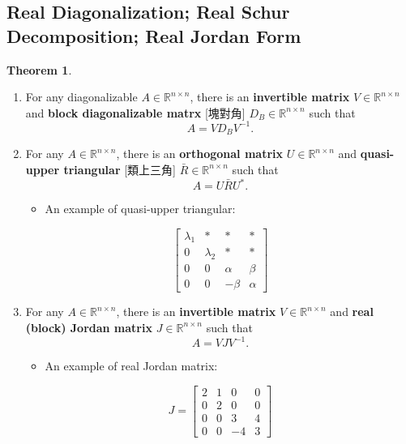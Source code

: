 \documentclass{article}
\theoremstyle{definition}
\newtheorem{theorem}{Theorem}[section]
\numberwithin{theorem}{section}
\numberwithin{equation}{section}
\begin{document}
\subsection{Real Diagonalization; Real Schur Decomposition; Real Jordan Form}

\begin{theorem}
    \begin{enumerate}
\item  For any diagonalizable $A \in \mathbb{R}^{n \times n}$, there is an \textbf{invertible matrix} $V\in \mathbb{R}^{n \times n}$ and \textbf{block diagonalizable matrx} [塊對角] $D_B\in \mathbb{R}^{n \times n}$ such that
  \[
   A= VD_BV^{-1}.
   \]
\item For any $A \in \mathbb{R}^{n \times n}$, there is an \textbf{orthogonal matrix} $U\in \mathbb{R}^{n \times n}$ and \textbf{quasi-upper triangular} [類上三角]
  $\bar{R}\in \mathbb{R}^{n \times n}$ such that
  \[
   A= U\bar{R}U^*.
   \]
  \begin{itemize}
  \item    An example of quasi-upper triangular:
  \end{itemize}
  \[
   \begin{bmatrix}
   \lambda_1 & * & * & * \\
   0 & \lambda_2 & * & * \\
   0 & 0 & \alpha & \beta \\
   0 & 0 & -\beta & \alpha
   \end{bmatrix}
   \]
\item For any $A \in \mathbb{R}^{n \times n}$, there is an \textbf{invertible matrix} $V\in \mathbb{R}^{n \times n}$ and \textbf{real (block) Jordan matrix} $J\in \mathbb{R}^{n \times n}$
  such that
  \[
   A= VJV^{-1}.
   \]
  \begin{itemize}
  \item    An example of real Jordan matrix:
  \end{itemize}
  \[
   J = \begin{bmatrix}
   2 & 1 & 0 & 0 \\
   0 & 2 & 0 & 0 \\
   0 & 0 & 3 & 4 \\
   0 & 0 & -4 & 3
   \end{bmatrix}
   \]
\end{enumerate}
\end{theorem}
\end{document}
